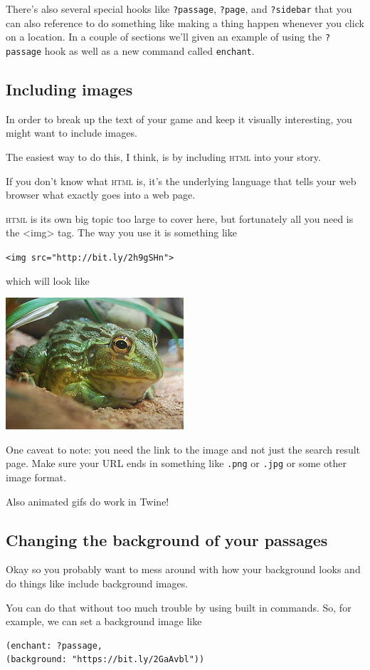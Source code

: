 \documentclass[a5paper,11pt]{article}
\begin{document}
There's also several special hooks like \verb"?passage", \verb"?page", and \verb"?sidebar" that you can also reference to do something like making a thing happen whenever you click on a location. In a couple of sections we'll given an example of using the \verb"?passage" hook as well as a new command called \texttt{enchant}.

\subsection{Including images}
In order to break up the text of your game and keep it visually interesting, you might want to include images.

The easiest way to do this, I think, is by including \textsc{html} into your story.

If you don't know what \textsc{html} is, it's the underlying language that tells your web browser what exactly goes into a web page.

\textsc{html} is its own big topic too large to cover here, but fortunately all you need is the <img> tag. The way you use it is something like

\verb|<img src="http://bit.ly/2h9gSHn">|

which will look like

\includegraphics{froggy}

One caveat to note: you need the link to the image and not just the search result page. Make sure your URL ends in something like \verb".png" or \verb".jpg" or some other image format.

Also animated gifs do work in Twine!
\subsection{Changing the background of your passages}
Okay so you probably want to mess around with how your background looks and do things like include background images.

You can do that without too much trouble by using built in commands. So, for example, we can set a background image like
\begin{verbatim}
(enchant: ?passage, 
(background: "https://bit.ly/2GaAvbl"))
\end{verbatim}
\end{document}
